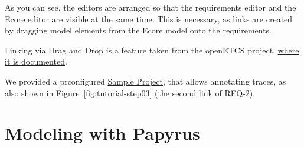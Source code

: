 As you can see, the editors are arranged so that the requirements editor and the Ecore editor are visible at the same time.  This is necessary, as links are created by dragging model elements from the Ecore model onto the requirements.

\begin{info}
Linking via Drag and Drop is a feature taken from the openETCS project, \href{https://github.com/openETCS/toolchain/wiki/User-Documentation#Tracing_Requirements_and_SysML_Models}{where it is documented}.
\end{info}

We provided a prconfigured \href{../se-materials/tutorial/tdse-3}{Sample Project}, that allows annotating traces, as also shown in Figure~\ref{fig:tutorial-step03} (the second link of REQ-2).


\section{Modeling with Papyrus}


